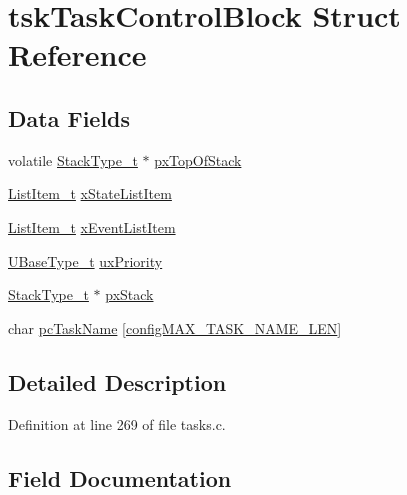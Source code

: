 \hypertarget{structtsk_task_control_block}{}\section{tsk\+Task\+Control\+Block Struct Reference}
\label{structtsk_task_control_block}
\subsection*{Data Fields}
\begin{DoxyCompactItemize}
\item 
volatile \hyperlink{portmacro_8h_a84e9a8ba132feed0b2401c1f4e2ac63c}{Stack\+Type\+\_\+t} $\ast$ \hyperlink{structtsk_task_control_block_a429a186c7f8e34aba1eef5e12d215b90}{px\+Top\+Of\+Stack}
\item 
\hyperlink{list_8h_a1a62d469392f9bfe2443e7efab9c8398}{List\+Item\+\_\+t} \hyperlink{structtsk_task_control_block_a16e0d20425d53ac78537e1fdb8834cf6}{x\+State\+List\+Item}
\item 
\hyperlink{list_8h_a1a62d469392f9bfe2443e7efab9c8398}{List\+Item\+\_\+t} \hyperlink{structtsk_task_control_block_a1a1612b6081a13683808284d93a9b28f}{x\+Event\+List\+Item}
\item 
\hyperlink{portmacro_8h_a646f89d4298e4f5afd522202b11cb2e6}{U\+Base\+Type\+\_\+t} \hyperlink{structtsk_task_control_block_a79187811e3d2a15595942e3b44237d85}{ux\+Priority}
\item 
\hyperlink{portmacro_8h_a84e9a8ba132feed0b2401c1f4e2ac63c}{Stack\+Type\+\_\+t} $\ast$ \hyperlink{structtsk_task_control_block_a9a0d71a9f95dd0609f9911d9efd79134}{px\+Stack}
\item 
char \hyperlink{structtsk_task_control_block_a67d61291794f38afb5be5132078bc24f}{pc\+Task\+Name} \mbox{[}\hyperlink{_free_r_t_o_s_config_8h_ac388dc4041aab6997348828eb27fc1a8}{config\+M\+A\+X\+\_\+\+T\+A\+S\+K\+\_\+\+N\+A\+M\+E\+\_\+\+L\+EN}\mbox{]}
\end{DoxyCompactItemize}


\subsection{Detailed Description}


Definition at line 269 of file tasks.\+c.



\subsection{Field Documentation}
\mbox{\label{structtsk_task_control_block_a67d61291794f38afb5be5132078bc24f}} 
